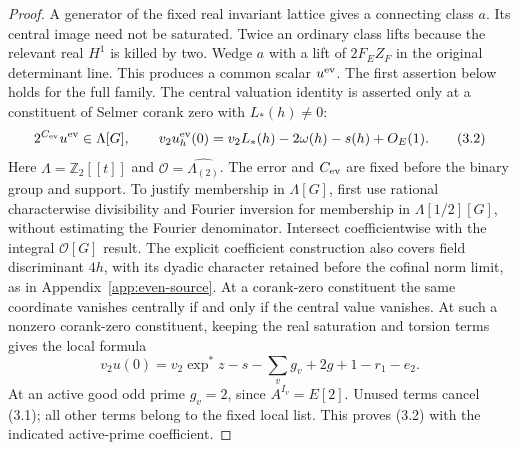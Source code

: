 \documentclass[11pt]{article}
\theoremstyle{definition}
\theoremstyle{remark}
\newcommand{\Z}{\mathbb Z}
\providecommand{\mathscr}[1]{\mathcal{#1}}
\begin{document}
\begin{proof}
A generator of the fixed real invariant lattice gives a connecting class $a$.
Its central image need not be saturated.
Twice an ordinary class lifts because the relevant real $H^1$ is killed
by two. Wedge $a$ with a lift of $2F_E Z_F$ in the original determinant
line. This produces a common scalar $u^{\rm ev}$.
The first assertion below holds for the full family. The central valuation
identity is asserted only at a constituent of Selmer corank zero with
$L_*(h)\ne0$:
\[
 2^{C_{\rm ev}}u^{\rm ev}\in\Lambda[G],\qquad
 v_2u^{\rm ev}_h(0)=v_2L_*(h)-2\omega(h)-s(h)+O_E(1).               \tag{3.2}
\]
Here $\Lambda=\Z_2[[t]]$ and
$\mathscr O=\widehat{\Lambda_{(2)}}$. The error and $C_{\rm ev}$ are
fixed before the binary group and support. To justify membership in
$\Lambda[G]$, first use rational characterwise divisibility and Fourier
inversion for membership in $\Lambda[1/2][G]$, without estimating the
Fourier denominator. Intersect coefficientwise with the integral
$\mathscr O[G]$ result. The explicit coefficient construction also covers field discriminant $4h$,
with its dyadic character retained before the cofinal norm limit, as in
Appendix~\ref{app:even-source}. At a corank-zero constituent the same coordinate
vanishes centrally if and only if the central value vanishes.
At such a nonzero corank-zero constituent, keeping the real saturation
and torsion terms gives the local formula
\[
 v_2u(0)=v_2\exp^*z-s-\sum_v g_v+2g+1-r_1-e_2.
\]
At an active good odd prime $g_v=2$, since $A^{I_v}=E[2]$.
Unused terms cancel (3.1); all other terms belong to the fixed local
list. This proves (3.2) with the indicated active-prime coefficient.
\end{proof}
\end{document}
